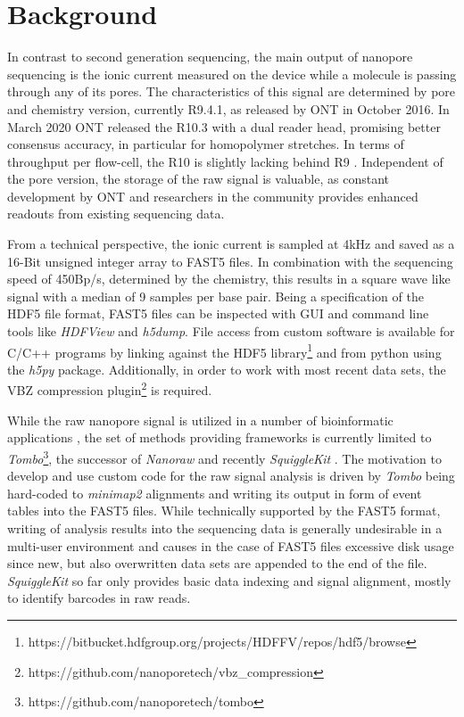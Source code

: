\section{Background}
\label{sec:signal:background}

In contrast to second generation sequencing, the main output of nanopore sequencing is the ionic current measured on the device while a molecule is passing through any of its pores. The characteristics of this signal are determined by pore and chemistry version, currently R9.4.1, as released by ONT in October 2016. In March 2020 ONT released the R10.3 with a dual reader head, promising better consensus accuracy, in particular for homopolymer stretches. In terms of throughput per flow-cell, the R10 is slightly lacking behind R9 \cite{ONT2020}. Independent of the pore version, the storage of the raw signal is valuable, as constant development by ONT and researchers in the community provides enhanced readouts from existing sequencing data.

From a technical perspective, the ionic current is sampled at 4kHz and saved as a 16-Bit unsigned integer array to FAST5 files. In combination with the sequencing speed of \texttildelow450Bp/s, determined by the chemistry, this results in a square wave like signal with a median of 9 samples per base pair. Being a specification of the HDF5 file format, FAST5 files can be inspected with GUI and command line tools like \textit{HDFView} and \textit{h5dump}. File access from custom software is available for C/C++ programs by linking against the HDF5 library\footnote{https://bitbucket.hdfgroup.org/projects/HDFFV/repos/hdf5/browse} and from python using the \textit{h5py} package. Additionally, in order to work with most recent data sets, the VBZ compression plugin\footnote{https://github.com/nanoporetech/vbz\_compression} is required.

While the raw nanopore signal is utilized in a number of bioinformatic applications \cite{Loose2016, Simpson2017, Wick2018}, the set of methods providing frameworks is currently limited to \textit{Tombo}\footnote{https://github.com/nanoporetech/tombo}, the successor of \textit{Nanoraw} \cite{Stoiber2017} and recently \textit{SquiggleKit} \cite{Ferguson2019}. The motivation to develop and use custom code for the raw signal analysis is driven by \textit{Tombo} being hard-coded to \textit{minimap2} alignments and writing its output in form of event tables into the FAST5 files. While technically supported by the FAST5 format, writing of analysis results into the sequencing data is generally undesirable in a multi-user environment and causes in the case of FAST5 files excessive disk usage since new, but also overwritten data sets are appended to the end of the file. \textit{SquiggleKit} so far only provides basic data indexing and signal alignment, mostly to identify barcodes in raw reads.

